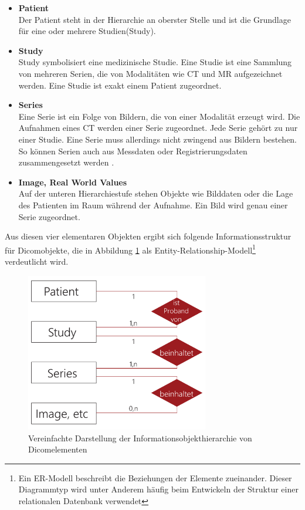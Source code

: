 \begin{itemize}
	\item \textbf{Patient}\\
	Der Patient steht in der Hierarchie an oberster Stelle und ist die Grundlage für eine oder mehrere Studien(Study).
	\item	\textbf{Study}\\
	Study symbolisiert eine medizinische Studie. Eine Studie ist eine Sammlung von mehreren Serien, die von Modalitäten wie CT und MR aufgezeichnet werden. Eine Studie ist exakt einem Patient zugeordnet.
	\item \textbf{Series}\\
	Eine Serie ist ein Folge von Bildern, die von einer Modalität erzeugt wird. Die Aufnahmen eines CT werden einer Serie zugeordnet. Jede Serie gehört zu nur einer Studie. Eine Serie muss allerdings nicht zwingend aus Bildern bestehen. So können Serien auch aus Messdaten oder Registrierungsdaten zusammengesetzt werden \cite[A.1.2]{dicom:iod}.
	\item \textbf{Image, Real World Values}\\
	Auf der unteren Hierarchiestufe stehen Objekte wie Bilddaten oder die Lage des Patienten im Raum während der Aufnahme. Ein Bild wird genau einer Serie zugeordnet.
\end{itemize}

Aus diesen vier elementaren Objekten ergibt sich folgende Informationsstruktur für Dicomobjekte, die in Abbildung \ref{ermodel} als Entity-Relationship-Modell\footnote{Ein ER-Modell beschreibt die Beziehungen der Elemente zueinander. Dieser Diagrammtyp wird unter Anderem häufig beim Entwickeln der Struktur einer relationalen Datenbank verwendet} verdeutlicht wird.

\begin{figure}[htbp]
  \vspace{0.5cm}
  \centering
  \includegraphics[angle=0,width=8cm]{./img/ermodel.pdf}
  \caption{Vereinfachte Darstellung der Informationsobjekthierarchie von Dicomelementen}
  \label{ermodel}
  \vspace{0.5cm}
\end{figure}

